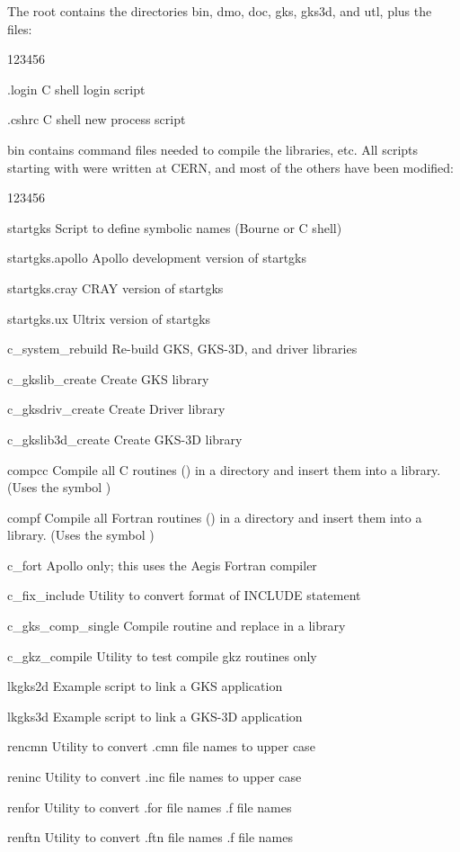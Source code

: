 The root contains the directories bin, dmo, doc, gks, gks3d, and utl,
plus the files:
\begin{DLtt}{123456}
\item[.login]C shell login script
\item[.cshrc]C shell new process script
\end{DLtt}
bin contains command files needed to compile the libraries, etc.
All scripts starting with  were written at CERN,
and most of the others have been modified:
\begin{DLtt}{123456}
\item[startgks]Script to define symbolic names (Bourne or C shell)
\item[startgks.apollo]Apollo development version of startgks
\item[startgks.cray]CRAY version of startgks
\item[startgks.ux]Ultrix version of startgks
\item[c\_system\_rebuild]Re-build GKS, GKS-3D, and driver libraries
\item[c\_gkslib\_create]Create GKS library
\item[c\_gksdriv\_create]Create Driver library
\item[c\_gkslib3d\_create]Create GKS-3D library
\item[compcc]Compile all C routines () in a directory
and insert them into a library.
(Uses the symbol )
\item[compf]Compile all Fortran routines () in a directory
and insert them into a library.
(Uses the symbol )
\item[c\_fort]Apollo only; this uses the Aegis Fortran compiler
\item[c\_fix\_include]Utility to convert format of INCLUDE statement
\item[c\_gks\_comp\_single]Compile routine and replace in a library
\item[c\_gkz\_compile]Utility to test compile gkz routines only
\item[lkgks2d]Example script to link a GKS application
\item[lkgks3d]Example script to link a GKS-3D application
\item[rencmn]Utility to convert .cmn file names to upper case
\item[reninc]Utility to convert .inc file names to upper case
\item[renfor]Utility to convert .for file names .f file names
\item[renftn]Utility to convert .ftn file names .f file names
\end{DLtt}
